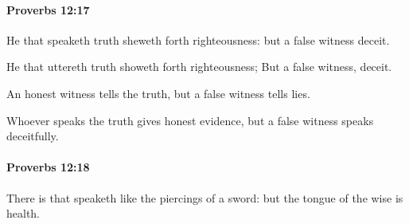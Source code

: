 		\paragraph{Proverbs 12:17} %
			\label{PROVERBS-12-17}

			He that speaketh truth sheweth forth righteousness: but a false witness deceit.

			\begin{versebox}
					\item[BHS] 
					\item[ASV] He that uttereth truth showeth forth righteousness; But a false witness, deceit.
					\item[NIV] An honest witness tells the truth, but a false witness tells lies.
					\item[NRSV] Whoever speaks the truth gives honest evidence, but a false witness speaks deceitfully.
			\end{versebox}

		\paragraph{Proverbs 12:18} %
			\label{PROVERBS-12-18}

			There is that speaketh like the piercings of a sword: but the tongue of the wise is health.

